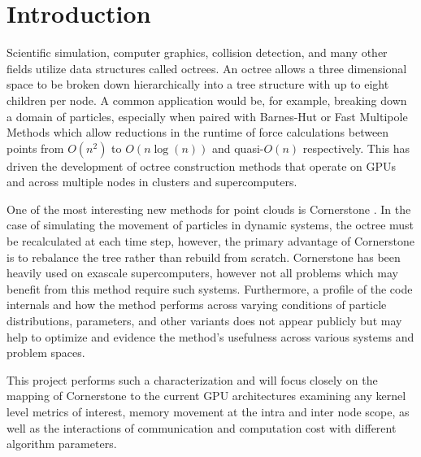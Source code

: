 \section{Introduction}
\label{sec:introduction}

Scientific simulation, computer graphics, collision detection, and many other fields utilize data structures called octrees. An octree allows a three dimensional space to be broken down hierarchically into a tree structure with up to eight children per node. A common application would be, for example, breaking down a domain of particles, especially when paired with Barnes-Hut or Fast Multipole Methods which allow reductions in the runtime of force calculations between points from $O(n^2)$ to $O(n\log(n))$ and quasi-$O(n)$ respectively. This has driven the development of octree construction methods that operate on GPUs and across multiple nodes in clusters and supercomputers. 

One of the most interesting new methods for point clouds is Cornerstone \cite{cornerstone}. In the case of simulating the movement of particles in dynamic systems, the octree must be recalculated at each time step, however, the primary advantage of Cornerstone is to rebalance the tree rather than rebuild from scratch. Cornerstone has been heavily used on exascale supercomputers, however not all problems which may benefit from this method require such systems. Furthermore, a profile of the code internals and how the method performs across varying conditions of particle distributions, parameters, and other variants does not appear publicly but may help to optimize and evidence the method's usefulness across various systems and problem spaces. 

This project performs such a characterization and will focus closely on the mapping of Cornerstone to the current GPU architectures examining any kernel level metrics of interest, memory movement at the intra and inter node scope, as well as the interactions of communication and computation cost with different algorithm parameters.
